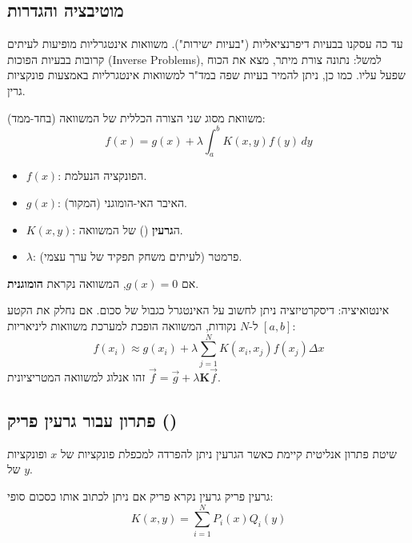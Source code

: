 \subsection{מוטיבציה והגדרות}
עד כה עסקנו בבעיות דיפרנציאליות ("בעיות ישירות"). משוואות אינטגרליות מופיעות לעיתים קרובות בבעיות הפוכות (Inverse Problems), למשל: נתונה צורת מיתר, מצא את הכוח שפעל עליו. כמו כן, ניתן להמיר בעיות שפה במד"ר למשוואות אינטגרליות באמצעות פונקציות גרין.

\begin{definitionbox}{משוואת  מסוג שני}
הצורה הכללית של המשוואה (בחד-ממד):
\[
f(x) = g(x) + \lambda \int_{a}^{b} K(x, y) f(y) \, dy
\]
\begin{itemize}
    \item $f(x)$: הפונקציה הנעלמת.
    \item $g(x)$: האיבר האי-הומוגני (המקור).
    \item $K(x, y)$: ה\textbf{גרעין} () של המשוואה.
    \item $\lambda$: פרמטר (לעיתים משחק תפקיד של ערך עצמי).
\end{itemize}
אם $g(x) = 0$, המשוואה נקראת \textbf{הומוגנית}.
\end{definitionbox}

\begin{notebox}{אינטואיציה: דיסקרטיזציה}
ניתן לחשוב על האינטגרל כגבול של סכום. אם נחלק את הקטע $[a,b]$ ל-$N$ נקודות, המשוואה הופכת למערכת משוואות ליניאריות:
\[
f(x_i) \approx g(x_i) + \lambda \sum_{j=1}^{N} K(x_i, x_j) f(x_j) \Delta x
\]
זהו אנלוג למשוואה המטריציונית $\vec{f} = \vec{g} + \lambda \mathbf{K} \vec{f}$.
\end{notebox}

\subsection{פתרון עבור גרעין פריק ()}

שיטת פתרון אנליטית קיימת כאשר הגרעין ניתן להפרדה למכפלת פונקציות של $x$ ופונקציות של $y$.

\begin{definitionbox}{גרעין פריק}
גרעין נקרא פריק אם ניתן לכתוב אותו כסכום סופי:
\[
K(x, y) = \sum_{i=1}^{N} P_i(x) Q_i(y)
\]
\end{definitionbox}

